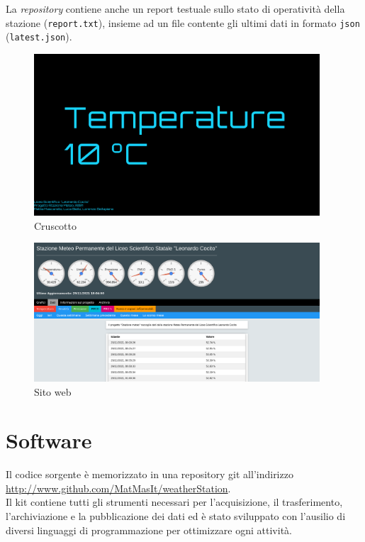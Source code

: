 \documentclass[12pt, a4paper]{article}
\begin{document}
	La \emph{repository} contiene anche un report testuale sullo stato di operatività della stazione (\texttt{report.txt}), insieme ad un file contente gli ultimi dati in formato \texttt{json} (\texttt{latest.json}).
	\clearpage
	\begin{figure}[!h]
		\centering
		\includegraphics[width=0.95\textwidth]{dash.png}
		\caption{Cruscotto}
		\label{fig:dash}
	\end{figure}
	
	\begin{figure}[!h]
		\centering
		\includegraphics[width=0.95\textwidth]{web.png}
		\caption{Sito web}
		\label{fig:web}
	\end{figure}
	\clearpage
	
	\section{Software}
	Il codice sorgente è memorizzato in una repository git all'indirizzo  \url{http://www.github.com/MatMasIt/weatherStation}.\\
	Il kit contiene tutti gli strumenti necessari per l'acquisizione, il trasferimento, l'archiviazione e la pubblicazione dei dati ed è stato sviluppato con l'ausilio di diversi linguaggi di programmazione per ottimizzare ogni attività.
\end{document}
